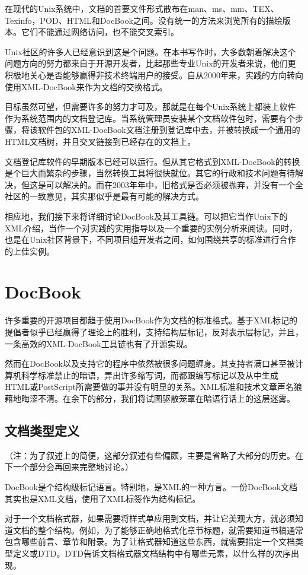 \documentclass[12pt,oneside]{book}
\begin{document}
在现代的Unix系统中，文档的首要文件形式散布在man、ms、mm、TEX、Texinfo，POD、HTML和DocBook之间。没有统一的方法来浏览所有的描绘版本。它们不能通过网络访问，也不能交叉索引。

Unix社区的许多人已经意识到这是个问题。在本书写作时，大多数朝着解决这个问题方向的努力都来自于开源开发者，比起那些专业Unix的开发者来说，他们更积极地关心是否能够赢得非技术终端用户的接受。自从2000年来，实践的方向转向使用XML-DocBook来作为文档的交换格式。

目标虽然可望，但需要许多的努力才可及，那就是在每个Unix系统上都装上软件作为系统范围内的文档登记库。当系统管理员安装某个文档软件包时，需要有个步骤，将该软件包的XML-DocBook文档注册到登记库中去，并被转换成一个通用的HTML文档树，并且交叉链接到已经存在的文档上。

文档登记库软件的早期版本已经可以运行。但从其它格式到XML-DocBook的转换是个巨大而繁杂的步骤，当然转换工具将很快就位。其它的行政和技术问题有待解决，但这是可以解决的。而在2003年年中，旧格式是否必须被抛弃，并没有一个全社区的一致意见，其实那似乎是最有可能的解决方式。

相应地，我们接下来将详细讨论DocBook及其工具链。可以把它当作Unix下的XML介绍，当作一个对实践的实用指导以及一个重要的实例分析来阅读。同时，也是在Unix社区背景下，不同项目组开发者之间，如何围绕共享的标准进行合作的上佳实例。

\section{DocBook}
许多重要的开源项目都趋于使用DocBook作为文档的标准格式。基于XML标记的提倡者似乎已经赢得了理论上的胜利，支持结构层标记，反对表示层标记，并且，一条高效的XML-DocBook工具链也有了开源实现。

然而在DocBook以及支持它的程序中依然被很多问题缠身。其支持者满口甚至被计算机科学标准禁止的暗语，弄出许多缩写词，而都跟编写标记以及从中生成HTML或PostScript所需要做的事并没有明显的关系。XML标准和技术文章声名狼藉地晦涩不清。在余下的部分，我们将试图驱散笼罩在暗语行话上的这层迷雾。

\subsection{文档类型定义}
（注：为了叙述上的简便，这部分叙述有些偏颇，主要是省略了大部分的历史。在下一个部分会再回来完整地讨论。）

DocBook是个结构级标记语言。特别地，是XML的一种方言。一份DocBook文档其实也是XML文档，使用了XML标签作为结构标记。

对于一个文档格式器，如果需要将样式单应用到文档，并让它美观大方，就必须知道文档的整个结构。例如，为了能够正确地格式化章节标题，就需要知道书稿通常包含哪些前言、章节和附录。为了让格式器知道这些东西，就需要指定一个文档类型定义或DTD。DTD告诉文档格式器文档结构中有哪些元素，以什么样的次序出现。
\end{document}
